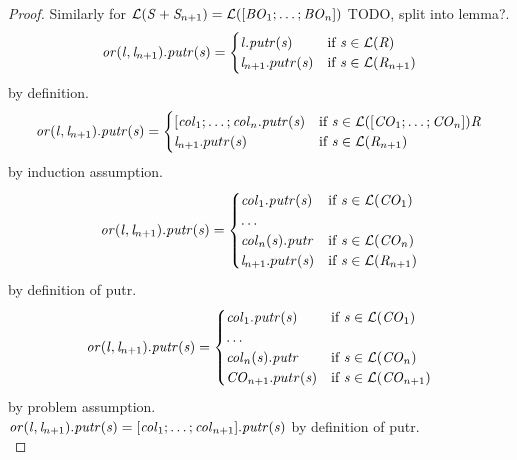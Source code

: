 \begin{lemma}
\begin{proof}
Similarly for
$\mathcal{L}(\mathit{S}+\mathit{S}_{n+1})
= \mathcal{L}([\mathit{BO}_1; \ldots ; \mathit{BO}_n])$ TODO, split into lemma?.\\
\[
\mathit{or}(\mathit{l},\mathit{l}_{n+1}).\mathit{putr}(\mathit{s}) =
  \begin{cases}
    \mathit{l}.\mathit{putr}(\mathit{s})& \text{if } \mathit{s} \in \mathcal{L}(\mathit{R})\\
    \mathit{l}_{n+1}.putr(\mathit{s})& \text{if } \mathit{s} \in \mathcal{L}(\mathit{R}_{n+1})
  \end{cases}
\] by definition.\\
\[
\mathit{or}(\mathit{l},\mathit{l}_{n+1}).\mathit{putr}(\mathit{s}) =
  \begin{cases}
    [\mathit{col}_1;\ldots;\mathit{col}_n.\mathit{putr}(\mathit{s})& \text{if } \mathit{s} \in \mathcal{L}([\mathit{CO}_1 ; \ldots ; \mathit{CO}_n]){\mathit{R}}\\
    \mathit{l}_{n+1}.putr(\mathit{s})& \text{if } \mathit{s} \in \mathcal{L}(\mathit{R}_{n+1})
  \end{cases}
\] by induction assumption.\\
\[
\mathit{or}(\mathit{l},\mathit{l}_{n+1}).\mathit{putr}(\mathit{s}) =
  \begin{cases}
    \mathit{col}_1.\mathit{putr}(\mathit{s})& \text{if } \mathit{s} \in \mathcal{L}(\mathit{CO}_1)\\
\ldots \\
    \mathit{col}_n(\mathit{s}).\mathit{putr}& \text{if } \mathit{s} \in \mathcal{L}(\mathit{CO}_n)\\
    \mathit{l}_{n+1}.putr(\mathit{s})& \text{if } \mathit{s} \in \mathcal{L}(\mathit{R}_{n+1})
  \end{cases}
\] by definition of putr.\\
\[
\mathit{or}(\mathit{l},\mathit{l}_{n+1}).\mathit{putr}(\mathit{s}) =
  \begin{cases}
    \mathit{col}_1.\mathit{putr}(\mathit{s})& \text{if } \mathit{s} \in \mathcal{L}(\mathit{CO}_1)\\
\ldots \\
    \mathit{col}_n(\mathit{s}).\mathit{putr}& \text{if } \mathit{s} \in \mathcal{L}(\mathit{CO}_n)\\
    \mathit{CO}_{n+1}.putr(\mathit{s})& \text{if } \mathit{s} \in \mathcal{L}(\mathit{CO}_{n+1})
  \end{cases}
\] by problem assumption.\\
$\mathit{or}(\mathit{l},\mathit{l}_{n+1}).\mathit{putr}(\mathit{s}) =
[\mathit{col}_1; \ldots ; \mathit{col}_{n+1}].\mathit{putr}(\mathit{s})$ by definition of putr.\\
\end{proof}
\end{lemma}

